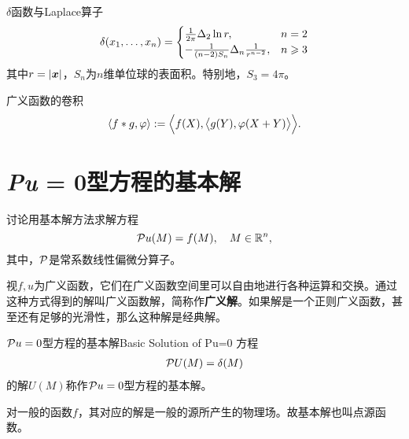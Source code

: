 \begin{example}{$\delta$函数与Laplace算子}{}
	\begin{equation}
		\delta(x_1,\ldots,x_n)=\begin{cases}
			\frac1{2\pi}\Delta_2\ln r,&n=2\\
			-\frac1{(n-2)S_{n}}\Delta_n\frac1{r^{n-2}},&n\geqslant 3
		\end{cases}
	\end{equation}
	其中$r=\left\lvert\bm x\right\rvert$，$S_n$为$n$维单位球的表面积。特别地，$S_3=4\pi$。
\end{example}
广义函数的卷积
\[
	\left\langle f\ast g,\varphi\right\rangle:=\Bigl\langle f(X),\bigl\langle g(Y),\varphi(X+Y)\bigr\rangle\Bigr\rangle.
\]

\section{\textit{Pu} = 0型方程的基本解} %
讨论用基本解方法求解方程
\[
	\mathcal P u(M)=f(M),\quad M\in\mathbb R^n,
\]
其中，$\mathcal P$是常系数线性偏微分算子。

视$f,u$为广义函数，它们在广义函数空间里可以自由地进行各种运算和交换。通过这种方式得到的解叫广义函数解，简称作\textbf{广义解}。如果解是一个正则广义函数，甚至还有足够的光滑性，那么这种解是经典解。
\begin{definition}{$\mathcal P u=0$型方程的基本解}{Basic Solution of Pu=0}
	方程
	\begin{align}
		\mathcal P U(M)=\mathop{}\!\delta(M)
	\end{align}
	的解$U(M)$称作$\mathcal P u=0$型方程的基本解。
\end{definition}
对一般的函数$f$，其对应的解是一般的源所产生的物理场。故基本解也叫点源函数。

